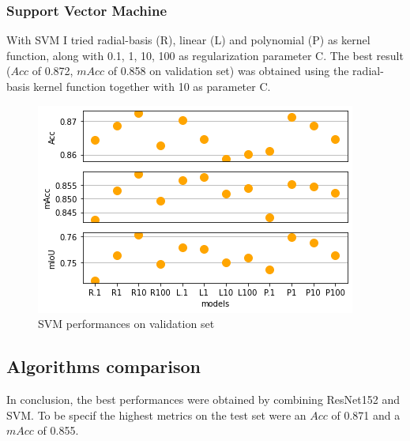 \documentclass[10pt,twocolumn,letterpaper]{article}
\begin{document}
\subsubsection{Support Vector Machine}

With SVM I tried radial-basis (R), linear (L) and polynomial (P) as kernel function, along with 0.1, 1, 10, 100 as regularization parameter C. The best result ($Acc$ of 0.872, $mAcc$ of 0.858 on validation set) was obtained using the radial-basis kernel function together with 10 as parameter C.

\begin{figure}[h]
\includegraphics[width=\linewidth]{SVM}
\caption{SVM performances on validation set}
\label{fig:SVM}
\end{figure}

\subsection{Algorithms comparison}

In conclusion, the best performances were obtained by combining ResNet152 and SVM. To be specif the highest metrics on the test set were an $Acc$ of 0.871 and a $mAcc$ of 0.855.



{\small


}
\end{document}
